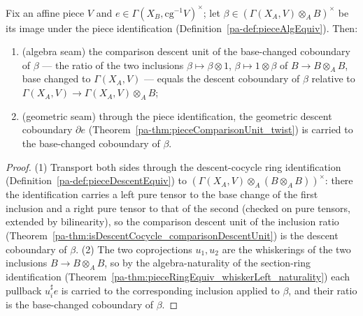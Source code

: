 \begin{theorem}
  \label{pa-thm:geomCoboundary_seams}
  \leanok

  Fix an affine piece \(V\) and \(e \in \Gamma(X_B, \mathrm{cg}^{-1}V)^{\times}\); let \(\beta \in
  (\Gamma(X_A, V) \otimes_A B)^{\times}\) be its image under the piece identification
  (Definition~\ref{pa-def:pieceAlgEquiv}). Then:
  \begin{enumerate}
    \item \textup{(algebra seam)} the comparison descent unit of the base-changed coboundary of
      \(\beta\) --- the ratio of the two inclusions \(\beta \mapsto \beta \otimes 1\), \(\beta
      \mapsto 1 \otimes \beta\) of \(B \to B \otimes_A B\), base changed to \(\Gamma(X_A, V)\) ---
      equals the descent coboundary of \(\beta\) relative to \(\Gamma(X_A, V) \to \Gamma(X_A, V)
      \otimes_A B\);
    \item \textup{(geometric seam)} through the piece identification, the geometric descent coboundary
      \(\partial e\) (Theorem~\ref{pa-thm:pieceComparisonUnit_twist}) is carried to the base-changed
      coboundary of \(\beta\).
  \end{enumerate}
\end{theorem}
\begin{proof}
  \leanok
  (1) Transport both sides through the descent-cocycle ring identification
  (Definition~\ref{pa-def:pieceDescentEquiv}) to \((\Gamma(X_A, V) \otimes_A (B \otimes_A B))^{\times}\):
  there the identification carries a left pure tensor to the base change of the first inclusion and a
  right pure tensor to that of the second (checked on pure tensors, extended by bilinearity), so the
  comparison descent unit of the inclusion ratio (Theorem~\ref{pa-thm:isDescentCocycle_comparisonDescentUnit})
  is the descent coboundary of \(\beta\). (2) The two coprojections \(u_1, u_2\) are the whiskerings
  of the two inclusions \(B \to B \otimes_A B\), so by the algebra-naturality of the section-ring
  identification (Theorem~\ref{pa-thm:pieceRingEquiv_whiskerLeft_naturality}) each pullback \(u_i^{\sharp}
  e\) is carried to the corresponding inclusion applied to \(\beta\), and their ratio is the
  base-changed coboundary of \(\beta\).
\end{proof}

